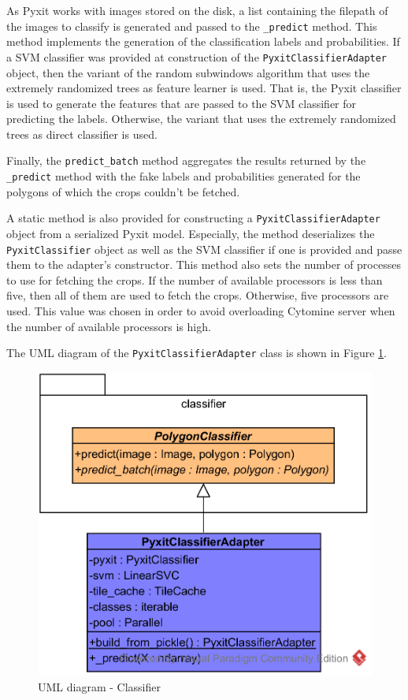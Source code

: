 As Pyxit works with images stored on the disk, a list containing the filepath of the images to classify is generated and passed to the \texttt{\_predict} method. This method implements the generation of the classification labels and probabilities. If a SVM classifier was provided at construction of the \texttt{PyxitClassifierAdapter} object, then the variant of the random subwindows algorithm that uses the extremely randomized trees as feature learner is used. That is, the Pyxit classifier is used to generate the features that are passed to the SVM classifier for predicting the labels. Otherwise, the variant that uses the extremely randomized trees as direct classifier is used. 

Finally, the \texttt{predict\_batch} method aggregates the results returned by the \texttt{\_predict} method with the fake labels and probabilities generated for the polygons of which the crops couldn't be fetched.

A static method is also provided for constructing a \texttt{PyxitClassifierAdapter} object from a serialized Pyxit model. Especially, the method deserializes the \texttt{PyxitClassifier} object as well as the SVM classifier if one is provided and passe them to the adapter's constructor. This method also sets the number of processes to use for fetching the crops. If the number of available processors is less than five, then all of them are used to fetch the crops. Otherwise, five processors are used. This value was chosen in order to avoid overloading Cytomine server when the number of available processors is high.

The UML diagram of the \texttt{PyxitClassifierAdapter} class is shown in Figure \ref{fig:uml_cyto_classifiers}.

\begin{figure}
	\center
	\includegraphics[scale=0.85]{image/thyroid_classifiers.png}
	\caption{UML diagram - Classifier}
	\label{fig:uml_cyto_classifiers}
\end{figure}

